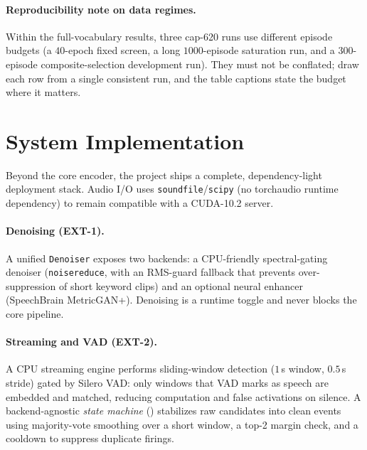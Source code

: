 \documentclass[10pt,twocolumn]{article}
\newcommand{\code}[1]{\texttt{\small #1}}
\begin{document}
\paragraph{Reproducibility note on data regimes.}
Within the full-vocabulary results, three cap-620 runs use different episode
budgets (a $40$-epoch fixed screen, a long $1000$-episode saturation run, and a
$300$-episode composite-selection development run). They must not be conflated;
 draw each row from a single consistent run,
and the table captions state the budget where it matters.

\section{System Implementation}\label{sec:system-impl}

Beyond the core encoder, the project ships a complete, dependency-light
deployment stack. Audio I/O uses \code{soundfile}/\code{scipy} (no torchaudio
runtime dependency) to remain compatible with a CUDA-10.2 server.

\paragraph{Denoising (EXT-1).}
A unified \code{Denoiser} exposes two backends: a CPU-friendly spectral-gating
denoiser (\code{noisereduce}, with an RMS-guard fallback that prevents
over-suppression of short keyword clips) and an optional neural enhancer
(SpeechBrain MetricGAN+). Denoising is a runtime toggle and never blocks the
core pipeline.

\paragraph{Streaming and VAD (EXT-2).}
A CPU streaming engine performs sliding-window detection ($1$\,s window,
$0.5$\,s stride) gated by Silero VAD: only windows that VAD marks as speech are
embedded and matched, reducing computation and false activations on silence.
A backend-agnostic \emph{state machine} () stabilizes raw
candidates into clean events using majority-vote smoothing over a short window,
a top-2 margin check, and a cooldown to suppress duplicate firings.
\end{document}
